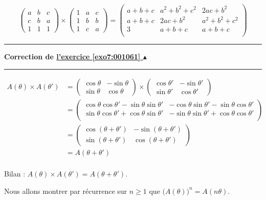 \documentclass[11pt,a4paper]{article}
\renewcommand{\ge}{\geqslant} \renewcommand{\geq}{\geqslant}
\newcounter{exo}
\newcommand{\correction}[1]{\hypertarget{cor7:#1}{}\label{cor7:#1}{\bf Correction de \hyperlink{exo7:#1}{l'exercice \ref{exo7:#1} $\blacktriangle$}}\vspace{1mm}\hrule\vspace{1mm}}
\newcommand{\fincorrection}{\vspace{1mm}\hrule\vspace*{7mm}}
\begin{document}
$$\left( \begin{array}{ccc} a &b& c \\ c & b & a \\ 1 & 1 & 1\end{array} \right)
\times
 \left( \begin{array}{ccc} 1 &a& c \\ 1 & b & b \\ 1 & c & a\end{array} \right) 
 = \begin{pmatrix}
    a + b + c & a^2+b^2+c^2 & 2ac + b^2 \\
    a + b + c & 2ac + b^2   & a^2+b^2+c^2 \\
    3         &  a+b+c      & a+b+c \\
\end{pmatrix}$$
\fincorrection
\correction{001061}
\begin{align*}
A(\theta)\times A(\theta')  
  & =  \begin{pmatrix} \cos \theta & -\sin \theta \\ \sin \theta
& \cos \theta \end{pmatrix} \times \begin{pmatrix} \cos \theta' & -\sin \theta' \\ \sin \theta'
& \cos \theta' \end{pmatrix} \\
  & = \begin{pmatrix} 
\cos \theta\cos \theta' -\sin \theta \sin\theta' & - \cos \theta \sin \theta' - \sin \theta \cos \theta' \\
 \sin \theta \cos \theta'+\cos \theta \sin \theta'   & -\sin \theta \sin\theta'+\cos \theta\cos \theta'  \\
 \end{pmatrix} \\
  & =
\begin{pmatrix} \cos (\theta+\theta') & -\sin (\theta+\theta')  \\ \sin  (\theta+\theta')
& \cos  (\theta+\theta') \end{pmatrix} \\
  & = A(\theta+\theta') \\
\end{align*}

Bilan : $A(\theta)\times A(\theta') = A(\theta+\theta')$.

\bigskip

Nous allons montrer par récurrence sur $n\ge 1$ que $\big(A(\theta)\big)^n = A(n\theta)$.
\end{document}
